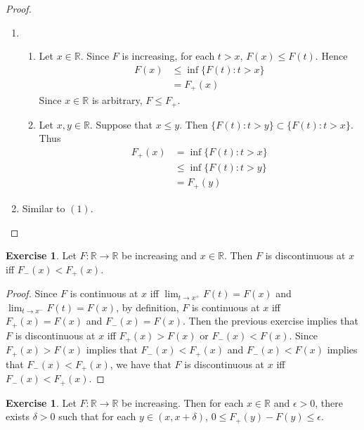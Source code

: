 \documentclass[12pt]{amsart}
\theoremstyle{definition}
\newtheorem{ex}[definition]{Exercise}
\newcommand{\del}{\delta}
\newcommand{\ep}{\epsilon}
\newcommand{\R}{\mathbb{R}}
\newcommand{\lex}[1]{\label{ex:#1}}
\begin{document}
	\begin{proof}\
		\begin{enumerate}
			\item 
			\begin{enumerate}
				\item  Let $x \in \R$. Since $F$ is increasing, for each $t > x$, $F(x) \leq F(t)$. Hence 
				\begin{align*}
					F(x)
					& \leq \inf \{F(t): t>x \} \\
					& = F_+(x)
				\end{align*}
				Since $x \in \R$ is arbitrary, $F \leq F_+$.
				\item  Let $x,y \in \R$. Suppose that $x \leq y$. Then $\{F(t): t>y \} \subset \{F(t): t>x \}$. Thus 
				\begin{align*}
					F_+(x)
					& = \inf \{F(t): t>x \} \\
					& \leq \inf \{F(t): t>y \} \\
					& = F_+(y)
				\end{align*}
			\end{enumerate}
			\item Similar to $(1)$.
		\end{enumerate}
	\end{proof}

	\begin{ex}
		Let $F:\R \rightarrow \R$ be increasing and $x \in \R$. Then $F$ is discontinuous at $x$ iff $F_-(x) < F_+(x)$.
	\end{ex}

	\begin{proof}
		Since $F$ is continuous at $x$ iff $\lim_{t \rightarrow x^+}F(t) = F(x)$ and $\lim_{t \rightarrow x^-}F(t) = F(x)$, by definition, $F$ is continuous at $x$ iff $F_+(x) = F(x)$ and $F_-(x) = F(x)$. Then the previous exercise implies that $F$ is discontinuous at $x$ iff $F_+(x) > F(x)$ or $F_-(x) < F(x)$. Since $F_+(x) > F(x)$ implies that $F_-(x) < F_+(x)$ and $F_-(x) < F(x)$ implies that $F_-(x) < F_+(x)$, we have that $F$ is discontinuous at $x$ iff $F_-(x) < F_+(x)$.
 	\end{proof}
	
	\begin{ex} \lex{00000} 
		Let $F:\R \rightarrow \R$ be increasing. Then for each $x \in \R$ and $ \ep>0$, there exists $\del >0$ such that for each $y \in (x,x+\del)$, $0 \leq F_+(y) - F(y) \leq \ep$.
	\end{ex}
	
\end{document}

